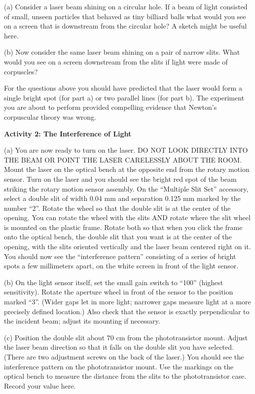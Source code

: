(a) Consider a laser beam shining on a circular hole. If a beam of
light consisted of small, unseen particles that behaved as tiny billiard
balls what would you see on a screen that is downstream from the circular
hole? A sketch might be useful here.
\vspace{35mm}

(b) Now consider the same laser beam shining on a pair of narrow slits.
What would you see on a screen downstream from the slits if light
were made of corpuscles?
\vspace{35mm}

For the questions above you should have predicted that the laser would
form a single bright spot (for part a) or two parallel lines (for part
b). The experiment you are about to perform provided compelling evidence
that Newton's corpuscular theory was wrong. 
\vspace{7mm}

\textbf{Activity 2: The Interference of Light }

(a) You are now ready to turn on the laser. DO NOT LOOK DIRECTLY INTO
THE BEAM OR POINT THE LASER CARELESSLY ABOUT THE ROOM. Mount the laser on the 
optical bench at the opposite end from the rotary motion sensor. Turn on the
laser and you should see the bright red spot of the beam striking
the rotary motion sensor assembly. On the ``Multiple Slit Set'' accessory, 
select a double slit of width 0.04 mm and separation 0.125 mm marked by the number “2”. 
Rotate the 
wheel so that the double slit is at the center of the opening.
You can rotate the wheel with the slits AND rotate where the slit wheel is mounted
on the plastic frame. Rotate both so that when you click the frame onto the optical bench, the double slit that
you want is at the center of the opening, with the slits oriented vertically and the laser beam centered right on
it. You should now see the “interference pattern” consisting of a series of bright spots a few millimeters apart,
on the white screen in front of the light sensor.

(b) On the light sensor itself, set the small gain switch to “100” (highest sensitivity). Rotate the aperture wheel
in front of the sensor to the position marked “3”. (Wider gaps let in more light; narrower gaps measure light
at a more precisely defined location.) Also check that the sensor is exactly perpendicular to the incident beam;
adjust its mounting if necessary.

(c) Position the double slit about 70 cm from the phototransistor mount. Adjust 
the laser beam direction so that it falls on the double slit you have selected. 
(There are two adjustment screws on the back of the laser.) 
You should see the interference pattern on the phototransistor mount. 
Use the markings on the optical bench to measure the distance from the slits
to the phototransistor case.
Record your value here.
\vspace{10mm}

